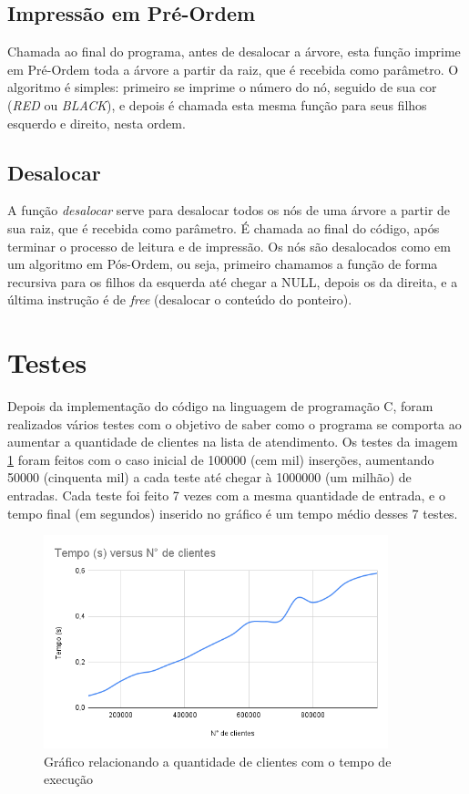 \documentclass[a4paper,11pt]{article}
\begin{document}
\subsection{Impressão em Pré-Ordem}
    Chamada ao final do programa, antes de desalocar a árvore, esta função imprime em Pré-Ordem toda a árvore a partir da raiz, que é recebida como parâmetro. O algoritmo é simples: primeiro se imprime o número do nó, seguido de sua cor (\textit{RED} ou \textit{BLACK}), e depois é chamada esta mesma função para seus filhos esquerdo e direito, nesta ordem.
    
\subsection{Desalocar}
    A função \textit{desalocar} serve para desalocar todos os nós de uma árvore a partir de sua raiz, que é recebida como parâmetro. É chamada ao final do código, após terminar o processo de leitura e de impressão. Os nós são desalocados como em um algoritmo em Pós-Ordem, ou seja, primeiro chamamos a função de forma recursiva para os filhos da esquerda até chegar a NULL, depois os da direita, e a última instrução é de \textit{free} (desalocar o conteúdo do ponteiro).
    
\bigskip
\section{Testes}
    Depois da implementação do código na linguagem de programação C, foram realizados vários testes com o objetivo de saber como o programa se comporta ao aumentar a quantidade de clientes na lista de atendimento. Os testes da imagem \ref{imagem:grafico} foram feitos com o caso inicial de 100000 (cem mil) inserções, aumentando 50000 (cinquenta mil) a cada teste até chegar à 1000000 (um milhão) de entradas. Cada teste foi feito 7 vezes com a mesma quantidade de entrada, e o tempo final (em segundos) inserido no gráfico é um tempo médio desses 7 testes. 
    
    \begin{figure}[h]
    \centering
    \includegraphics[width=10cm]{tudo/imagens/Tempo (s) versus N° de clientes.png}
    \caption{Gráfico relacionando a quantidade de clientes com o tempo de execução}
    \label{imagem:grafico}
    \end{figure}
    
\end{document}
